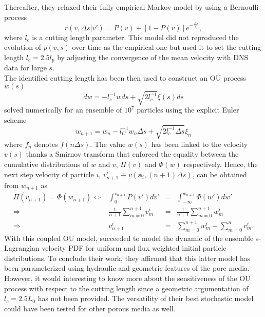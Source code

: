 Thereafter, they relaxed their fully empirical Markov model by using a Bernoulli process 
\begin{equation}\label{eq:bernoulli}
r(v,\Delta s|v')=P(v) + [1 - P(v)] e^{-\frac{\Delta s}{l_c}},
\end{equation}
where $l_c$ is a cutting length parameter. This model did not reproduced the evolution of $p(v,s)$ over time as the empirical one but \citeauthor{Puyguiraud2019} used it to set the cutting length $l_c=2.5l_p$ by adjusting the convergence of the mean velocity with DNS data for large $s$. \\
The identified cutting length has been then used to construct an OU process $w(s)$
\[
dw = -l_c^{-1}wds + \sqrt{2l_c^{-1}}\xi(s)ds
\]
solved numerically for an ensemble of $10^7$ particles using the explicit Euler scheme 
\[
w_{n+1}=w_n-l_C^{-1}w_n\Delta s + \sqrt{2l_c^{-1}\Delta s}\xi_n
\]
where $f_n$ denotes $f(n\Delta s)$.
The value $w(s)$ has been linked to the velocity $v(s)$ thanks a Smirnov transform that enforced the equality between the cumulative distributions of $w$ and $v$, $\Pi(v)$ and $\Phi(w)$ respectively. 
Hence, the next step velocity of particle $i$, $v_{n+1}^i\equiv v(\textbf{a}_i,(n+1)\Delta s)$, can be obtained from $w_{n+1}$ as
\[
\begin{array}{rrcl}
\Pi(v_{n+1}) = \Phi(w_{n+1}) \Leftrightarrow& \int_0^{v_{n+1}} P(v')dv' &=& \int_{-\infty}^{w_{n+1}}\Phi(w')dw'\\
\Rightarrow& \frac{1}{n+1}\sum_{m=0}^{n+1}v^i_m&=&\frac{1}{n+1}\sum_{m=0}^{n+1}w^i_m\\
\Rightarrow & v^i_{n+1} &=& \sum_{m=0}^{n+1}w^i_m - \sum_{m=0}^{n}v^i_m.
\end{array}
\]
With this coupled OU model, \citeauthor{Puyguiraud2019} succeeded to model the dynamic of the ensemble s-Lagrangian velocity PDF for uniform and flux weighted initial particle distributions.
To conclude their work, they affirmed that this latter model has been parameterized using hydraulic and geometric features of the pore media. 
However, it would interesting to know more about the sensitiveness of the OU process with respect to the cutting length since a geometric argumentation of $l_c=2.5L_0$ has not been provided.
The versatility of their best stochastic model could have been tested for other porous media as well.

